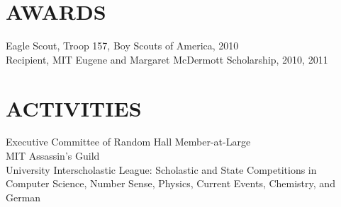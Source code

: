 \documentclass[margin]{res}
\begin{document}
\begin{resume}
 
\section{AWARDS} Eagle Scout, Troop 157, Boy Scouts of America, 2010\\
        Recipient, MIT Eugene and Margaret McDermott Scholarship, 2010, 2011\\ 

\section{ACTIVITIES}             
        Executive Committee of Random Hall Member-at-Large \\
        MIT Assassin's Guild \\
        University Interscholastic League: Scholastic and State Competitions in
        Computer Science, Number Sense, Physics, Current Events, Chemistry, and German
 

\end{resume}
\end{document}
